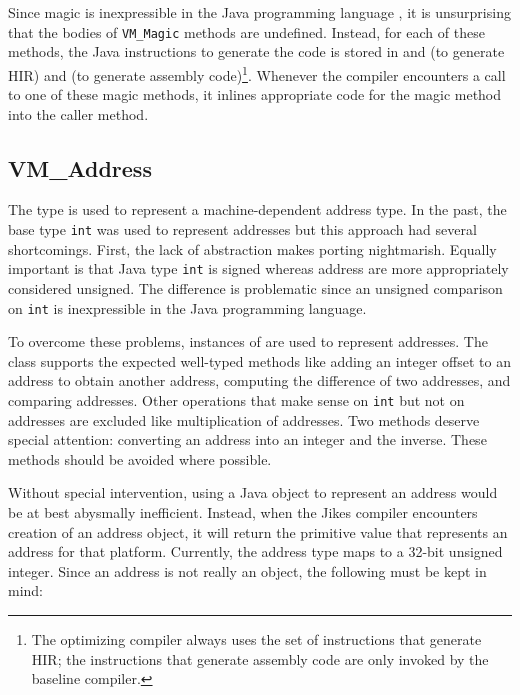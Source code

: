 Since magic is inexpressible in the Java programming language , it is
unsurprising that the bodies of {\tt VM\_Magic} methods are undefined.
Instead, for each of these methods, the Java instructions to generate
the code is stored in
 and 
 (to generate HIR) and 
 (to generate assembly code)\footnote{The optimizing
compiler always uses the set of instructions that generate HIR; the
instructions that generate assembly code are only invoked by the
baseline compiler.}.  Whenever the compiler encounters a call to one of these
magic methods, it inlines appropriate code for the magic method into the caller method.

\subsection{VM\_Address}
The type  is used to represent a machine-dependent
address type.  In the past, the base type {\tt int} was used to
represent addresses but this approach had several shortcomings.
First, the lack of abstraction makes porting nightmarish.  Equally
important is that Java type {\tt int} is signed whereas address are
more appropriately considered unsigned.  The difference is problematic
since an unsigned comparison on {\tt int} is inexpressible in the Java
programming language.

To overcome these problems, instances of  are used to
represent addresses.  The class supports the expected well-typed
methods like adding an integer offset to an address to obtain another
address, computing the difference of two addresses, and comparing
addresses.  Other operations that make sense on {\tt int} but not on
addresses are excluded like multiplication of addresses.  Two methods
deserve special attention: converting an address into an integer and
the inverse.  These methods should be avoided where possible.

Without special intervention, using a Java object to represent an
address would be at best abysmally inefficient.  Instead, when the
Jikes compiler encounters creation of an address object, it will
return the primitive value that represents an address for that
platform.  Currently, the address type maps to a 32-bit unsigned
integer.  Since an address is not really an object, the following must
be kept in mind:

